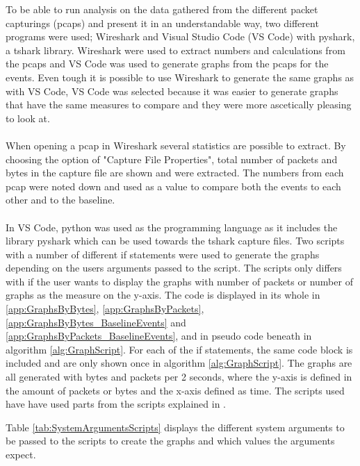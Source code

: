 To be able to run analysis on the data gathered from the different packet capturings (pcaps) and present it in an understandable way, two different programs were used; Wireshark and Visual Studio Code (VS Code) with pyshark, a tshark library. Wireshark were used to extract numbers and calculations from the pcaps and VS Code was used to generate graphs from the pcaps for the events. Even tough it is possible to use Wireshark to generate the same graphs as with VS Code, VS Code was selected because it was easier to generate graphs that have the same measures to compare and they were more ascetically pleasing to look at.
\\\\
When opening a pcap in Wireshark several statistics are possible to extract. By choosing the option of "Capture File Properties", total number of packets and bytes in the capture file are shown and were extracted. The numbers from each pcap were noted down and used as a value to compare both the events to each other and to the baseline. 
\\\\
In VS Code, python was used as the programming language as it includes the library pyshark which can be used towards the tshark capture files. Two scripts with a number of different if statements were used to generate the graphs depending on the users arguments passed to the script. The scripts only differs with if the user wants to display the graphs with number of packets or number of graphs as the measure on the y-axis. The code is displayed in its whole in \ref{app:GraphsByBytes}, \ref{app:GraphsByPackets}, \ref{app:GraphsByBytes_BaselineEvents} and \ref{app:GraphsByPackets_BaselineEvents}, and in pseudo code beneath in algorithm \ref{alg:GraphScript}. For each of the if statements, the same code block is included and are only shown once in algorithm \ref{alg:GraphScript}. The graphs are all generated with bytes and packets per 2 seconds, where the y-axis is defined in the amount of packets or bytes and the x-axis defined as time. The scripts used have have used parts from the scripts explained in \cite{GraphsInspiration}.

Table \ref{tab:SystemArgumentsScripts} displays the different system arguments to be passed to the scripts to create the graphs and which values the arguments expect. 

